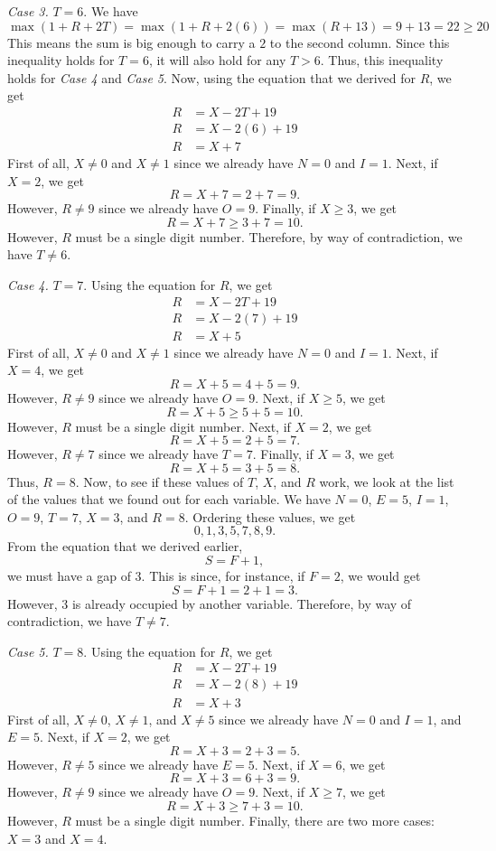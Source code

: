 \documentclass[12pt]{article}
\begin{document}
\noindent\textit{Case 3.} $T=6$. We have
\[\max(1+R+2T)=\max(1+R+2(6))=\max(R+13)=9+13=22\geq 20\]
This means the sum is big enough to carry a $2$ to the second column. Since this inequality holds for $T=6$, it will also hold for any $T>6$. Thus, this inequality holds for \textit{Case 4} and \textit{Case 5}. Now, using the equation that we derived for $R$, we get
\begin{align*}
    R&=X-2T+19\\
    R&=X-2(6)+19\\
    R&=X+7
\end{align*}
First of all, $X\neq 0$ and $X\neq 1$ since we already have $N=0$ and $I=1$. Next, if $X=2$, we get
\[R=X+7=2+7=9.\]
However, $R\neq 9$ since we already have $O=9$. Finally, if $X\geq 3$, we get
\[R=X+7\geq 3+7=10.\]
However, $R$ must be a single digit number. Therefore, by way of contradiction, we have $T\neq 6$.
\newpage

\noindent\textit{Case 4.} $T=7$. Using the equation for $R$, we get
\begin{align*}
    R&=X-2T+19\\
    R&=X-2(7)+19\\
    R&=X+5
\end{align*}
First of all, $X\neq 0$ and $X\neq 1$ since we already have $N=0$ and $I=1$. Next, if $X=4$, we get
\[R=X+5=4+5=9.\]
However, $R\neq 9$ since we already have $O=9$. Next, if $X\geq 5$, we get
\[R=X+5\geq 5+5=10.\]
However, $R$ must be a single digit number. Next, if $X=2$, we get
\[R=X+5=2+5=7.\]
However, $R\neq 7$ since we already have $T=7$. Finally, if $X=3$, we get
\[R=X+5=3+5=8.\]
Thus, $R=8$. Now, to see if these values of $T$, $X$, and $R$ work, we look at the list of the values that we found out for each variable. We have $N=0$, $E=5$, $I=1$, $O=9$, $T=7$, $X=3$, and $R=8$. Ordering these values, we get
\[0,1,3,5,7,8,9.\]
From the equation that we derived earlier,
\[S=F+1,\]
we must have a gap of $3$. This is since, for instance, if $F=2$, we would get \[S=F+1=2+1=3.\]
However, $3$ is already occupied by another variable. Therefore, by way of contradiction, we have $T\neq 7$.
\newpage

\noindent\textit{Case 5.} $T=8$. Using the equation for $R$, we get
\begin{align*}
    R&=X-2T+19\\
    R&=X-2(8)+19\\
    R&=X+3
\end{align*}
First of all, $X\neq 0$, $X\neq 1$, and $X\neq 5$ since we already have $N=0$ and $I=1$, and $E=5$. Next, if $X=2$, we get
\[R=X+3=2+3=5.\]
However, $R\neq 5$ since we already have $E=5$. Next, if $X=6$, we get
\[R=X+3=6+3=9.\]
However, $R\neq 9$ since we already have $O=9$. Next, if $X\geq 7$, we get
\[R=X+3\geq 7+3=10.\]
However, $R$ must be a single digit number. Finally, there are two more cases: $X=3$ and $X=4$.
\vspace{20px}
\end{document}
